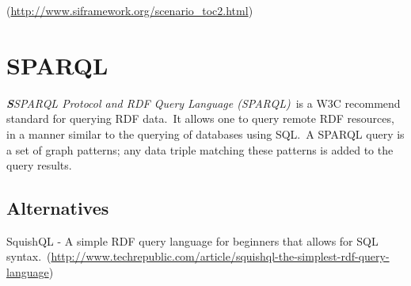 \documentclass[DIV=calc, paper=a4, fontsize=12pt, onecolumn]{scrartcl}	 %
\newcommand{\initial}[1]{ %
\lettrine[lines=3,lhang=0.3,nindent=0em,slope=0em]{
\color{DarkBlue}
{\textbf{\textit{#1}}}}{}}
\begin{document}
  (\url{http://www.siframework.org/scenario_toc2.html})\


  \section[SPARQL Protocol and RDF Query Language (SPARQL)]{SPARQL}
  \label{sec:sparql}

  \initial{S}\textit{SPARQL Protocol and RDF Query Language (SPARQL)}\
  is a W3C recommend standard for querying RDF data.\
  It allows one to query remote RDF resources, in a manner similar to the querying of databases using SQL.\
  A SPARQL query is a set of graph patterns; any data triple matching these patterns is added to the query results.\
  \citep{Jarrar_mashql:_2008}\\     
		
  \subsection{Alternatives}

  SquishQL - A simple RDF query language for beginners that allows for SQL syntax.\
  \noindent(\url{http://www.techrepublic.com/article/squishql-the-simplest-rdf-query-language})\\
\end{document}

